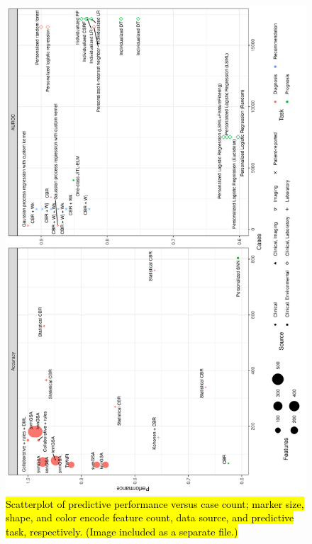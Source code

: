 \documentclass[sn-mathphys,Numbered,pdflatex]{sn-jnl}
\theoremstyle{remark}
\theoremstyle{definition}
\begin{document}
\begin{figure}[H]

{\centering \includegraphics[width=1\linewidth]{Fig6} 

}

\caption{\hl{Scatterplot of predictive performance versus case count;
 marker size, shape, and color
 encode feature count, data source, and predictive task, respectively.
 (Image included as a separate file.)}}\label{fig:performance}
\end{figure}

\renewcommand\refname{References}

\end{document}
